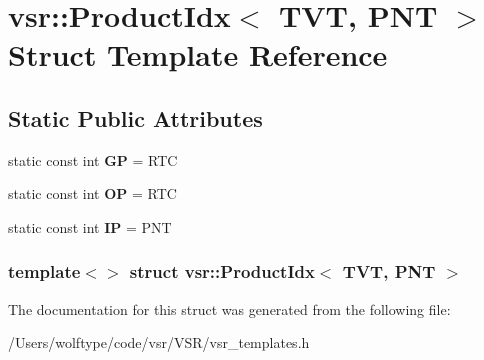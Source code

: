 \hypertarget{structvsr_1_1_product_idx_3_01_t_v_t_00_01_p_n_t_01_4}{\section{vsr\-:\-:Product\-Idx$<$ T\-V\-T, P\-N\-T $>$ Struct Template Reference}
\label{structvsr_1_1_product_idx_3_01_t_v_t_00_01_p_n_t_01_4}
}
\subsection*{Static Public Attributes}
\begin{DoxyCompactItemize}
\item 
\hypertarget{structvsr_1_1_product_idx_3_01_t_v_t_00_01_p_n_t_01_4_a04724ccb686a3a7d8a3c0e4fd0d27510}{static const int {\bfseries G\-P} = R\-T\-C}\label{structvsr_1_1_product_idx_3_01_t_v_t_00_01_p_n_t_01_4_a04724ccb686a3a7d8a3c0e4fd0d27510}

\item 
\hypertarget{structvsr_1_1_product_idx_3_01_t_v_t_00_01_p_n_t_01_4_aa3e6c707f5a431e862c0e1b9f31d4088}{static const int {\bfseries O\-P} = R\-T\-C}\label{structvsr_1_1_product_idx_3_01_t_v_t_00_01_p_n_t_01_4_aa3e6c707f5a431e862c0e1b9f31d4088}

\item 
\hypertarget{structvsr_1_1_product_idx_3_01_t_v_t_00_01_p_n_t_01_4_a3722ceecd5d4f21da74d2011583198d7}{static const int {\bfseries I\-P} = P\-N\-T}\label{structvsr_1_1_product_idx_3_01_t_v_t_00_01_p_n_t_01_4_a3722ceecd5d4f21da74d2011583198d7}

\end{DoxyCompactItemize}
\subsubsection*{template$<$$>$ struct vsr\-::\-Product\-Idx$<$ T\-V\-T, P\-N\-T $>$}



The documentation for this struct was generated from the following file\-:\begin{DoxyCompactItemize}
\item 
/\-Users/wolftype/code/vsr/\-V\-S\-R/vsr\-\_\-templates.\-h\end{DoxyCompactItemize}
